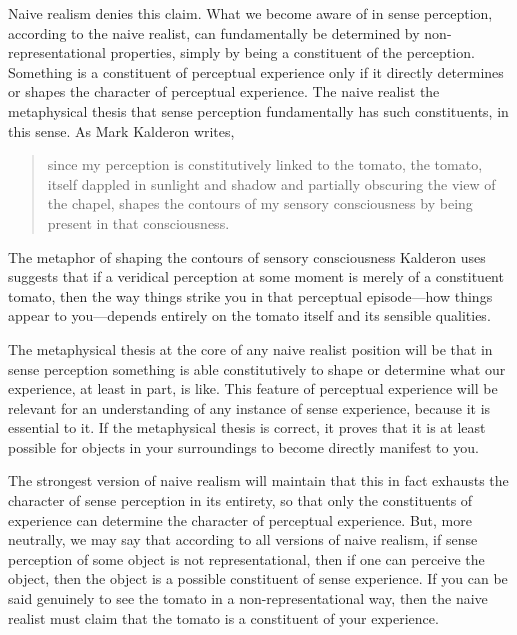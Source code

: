 \documentclass[sloppy, journal, git, bytitle, dodraft]{humapap}
\begin{document}
Naive realism denies this claim. What we become aware of in sense perception, according to the naive realist, can fundamentally be determined by non-representational properties, simply by being a constituent of the perception. Something is a constituent of perceptual experience only if it directly determines or shapes the character of perceptual experience. The naive realist the metaphysical thesis that sense perception fundamentally has such constituents, in this sense. As Mark Kalderon writes,  
\begin{quote}
since my perception is constitutively linked to the tomato, the tomato, itself dappled in sunlight and shadow and partially obscuring the view of the chapel, shapes the contours of my sensory consciousness by being present in that consciousness.
\end{quote}
The metaphor of shaping the contours of sensory consciousness Kalderon uses suggests that if a veridical perception at some moment is merely of a constituent tomato, then the way things strike you in that perceptual episode---how things appear to you---depends entirely on the tomato itself and its sensible qualities. 

The metaphysical thesis at the core of any naive realist position will be that in sense perception something is able constitutively to shape or determine what our experience, at least in part, is like. This feature of perceptual experience will be relevant for an understanding of any instance of sense experience, because it is essential to it. If the metaphysical thesis is correct, it proves that it is at least possible for objects in your surroundings to become directly manifest to you. 

The strongest version of naive realism will maintain that this in fact exhausts the character of sense perception in its entirety, so that only the constituents of experience can determine the character of perceptual experience. But, more neutrally, we may say that according to all versions of naive realism, if sense perception of some object is not representational, then if one can perceive the object, then the object is a possible constituent of sense experience. If you can be said genuinely to see the tomato in a non-representational way, then the naive realist must claim that the tomato is a constituent of your experience. 
\end{document}
